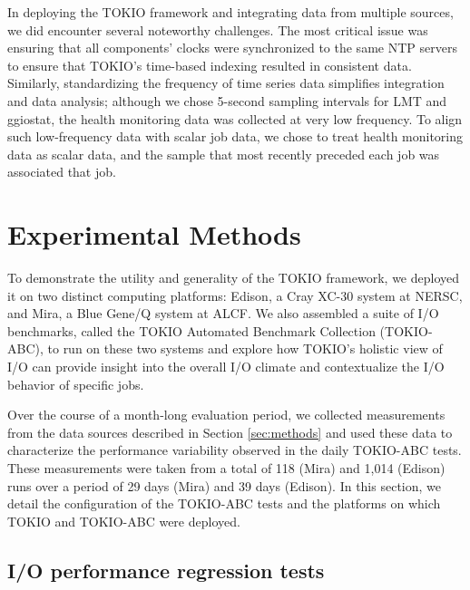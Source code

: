 In deploying the TOKIO framework and integrating data from multiple sources, we did encounter several noteworthy challenges.
The most critical issue was ensuring that all components' clocks were synchronized to the same NTP servers to ensure that TOKIO's time-based indexing resulted in consistent data.
Similarly, standardizing the frequency of time series data simplifies integration and data analysis; although we chose 5-second sampling intervals for LMT and ggiostat, the health monitoring data was collected at very low frequency.
To align such low-frequency data with scalar job data, we chose to treat health monitoring data as scalar data, and the sample that most recently preceded each job was associated that job.

\section{Experimental Methods} \label{sec:platforms}

To demonstrate the utility and generality of the TOKIO framework, we deployed it on two distinct computing platforms: Edison, a Cray XC-30 system at NERSC, and Mira, a Blue Gene/Q system at ALCF.
We also assembled a suite of I/O benchmarks, called the TOKIO Automated Benchmark Collection (TOKIO-ABC), to run on these two systems and explore how TOKIO's holistic view of I/O can provide insight into the overall I/O climate and contextualize the I/O behavior of specific jobs.

Over the course of a month-long evaluation period, we collected measurements from the data sources described in Section \ref{sec:methods} and used these data to characterize the performance variability observed in the daily TOKIO-ABC tests.
These measurements were taken from a total of 118 (Mira) and 1,014 (Edison) runs over a period of 29 days (Mira) and 39 days (Edison).
In this section, we detail the configuration of the TOKIO-ABC tests and the platforms on which TOKIO and TOKIO-ABC were deployed.

\subsection{I/O performance regression tests} \label{sec:methods/tests}

